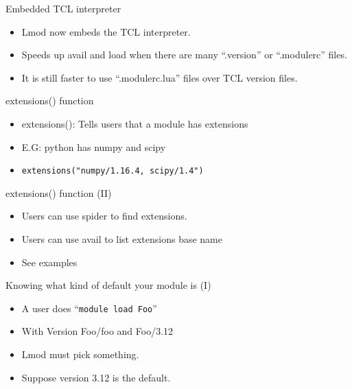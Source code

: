 \documentclass{beamer}
\begin{document}
\begin{frame}{Embedded TCL interpreter}
  \begin{itemize}
    \item Lmod now embeds the TCL interpreter.
    \item Speeds up avail and load when there are many ``.version'' or
      ``.modulerc'' files.
    \item It is still faster to use ``.modulerc.lua'' files over TCL
      version files.
  \end{itemize}
\end{frame}


\begin{frame}{extensions() function}
  \begin{itemize}
    \item extensions(): Tells users that a module has extensions
    \item E.G: python has numpy and scipy
    \item \texttt{extensions("numpy/1.16.4, scipy/1.4")}
  \end{itemize}
\end{frame}

\begin{frame}{extensions() function (II)}
  \begin{itemize}
    \item Users can use spider to find extensions.
    \item Users can use avail to list extensions base name
    \item See examples
  \end{itemize}
\end{frame}

\begin{frame}{Knowing what kind of default your module is (I)}
  \begin{itemize}
    \item A user does ``\texttt{module load Foo}''
    \item With Version Foo/foo and Foo/3.12
    \item Lmod must pick something.  
    \item Suppose version 3.12 is the default.
  \end{itemize}
\end{frame}
\end{document}
